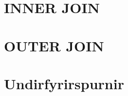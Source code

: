 \section{INNER JOIN}
\section{OUTER JOIN}
\section{Undirfyrirspurnir}
\label{undirkafli:undirfyrirspurnir}